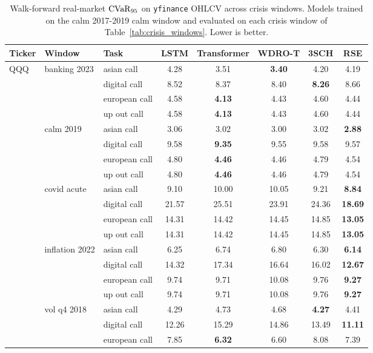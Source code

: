 \begin{table}[H]\centering\scriptsize
\caption{Walk-forward real-market $\mathrm{CVaR}_{95}$ on \texttt{yfinance} OHLCV across crisis windows. Models trained on the calm 2017-2019 calm window and evaluated on each crisis window of Table~\ref{tab:crisis_windows}.  Lower is better.}
\label{tab:real_results}
\begin{tabular}{lllccccc}
\toprule
Ticker & Window & Task & LSTM & Transformer & WDRO-T & 3SCH & RSE \\
\midrule
QQQ & banking 2023 & asian call & 4.28 & 3.51 & \textbf{3.40} & 4.20 & 4.19 \\
 &  & digital call & 8.52 & 8.37 & 8.40 & \textbf{8.26} & 8.66 \\
 &  & european call & 4.58 & \textbf{4.13} & 4.43 & 4.60 & 4.44 \\
 &  & up out call & 4.58 & \textbf{4.13} & 4.43 & 4.60 & 4.44 \\
 & calm 2019 & asian call & 3.06 & 3.02 & 3.00 & 3.02 & \textbf{2.88} \\
 &  & digital call & 9.58 & \textbf{9.35} & 9.55 & 9.58 & 9.57 \\
 &  & european call & 4.80 & \textbf{4.46} & 4.46 & 4.79 & 4.54 \\
 &  & up out call & 4.80 & \textbf{4.46} & 4.46 & 4.79 & 4.54 \\
 & covid acute & asian call & 9.10 & 10.00 & 10.05 & 9.21 & \textbf{8.84} \\
 &  & digital call & 21.57 & 25.51 & 23.91 & 24.36 & \textbf{18.69} \\
 &  & european call & 14.31 & 14.42 & 14.45 & 14.85 & \textbf{13.05} \\
 &  & up out call & 14.31 & 14.42 & 14.45 & 14.85 & \textbf{13.05} \\
 & inflation 2022 & asian call & 6.25 & 6.74 & 6.80 & 6.30 & \textbf{6.14} \\
 &  & digital call & 14.32 & 17.34 & 16.64 & 16.02 & \textbf{12.67} \\
 &  & european call & 9.74 & 9.71 & 10.08 & 9.76 & \textbf{9.27} \\
 &  & up out call & 9.74 & 9.71 & 10.08 & 9.76 & \textbf{9.27} \\
 & vol q4 2018 & asian call & 4.29 & 4.73 & 4.68 & \textbf{4.27} & 4.41 \\
 &  & digital call & 12.26 & 15.29 & 14.86 & 13.49 & \textbf{11.11} \\
 &  & european call & 7.85 & \textbf{6.32} & 6.60 & 8.08 & 7.39 \\

\end{tabular}
\end{table}
